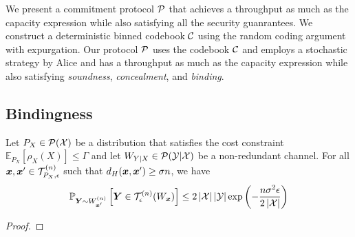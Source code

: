 We present a commitment protocol $\mathcal{P}$ that achieves a throughput as much as the capacity expression while also satisfying all the security guanrantees. 
We construct a deterministic binned codebook $\mathcal{C}$ using the random coding argument with expurgation.
Our protocol $\mathcal{P}$ uses the codebook $\mathcal{C}$ and employs a stochastic strategy by Alice and has a throughput as much as the capacity expression while also satisfying \emph{soundness}, \emph{concealment}, and \emph{binding}.

\subsection{Bindingness}

\begin{lemma}
    \label{lem:binding}
    Let $P_X \in \mathcal{P}(\mathcal{X})$ be a distribution that satisfies the cost constraint $\mathbb{E}_{P_X}[\rho_X(X)]\leq \Gamma$ and let $W_{Y|X} \in \mathcal{P}(\mathcal{Y}|\mathcal{X})$ be a non-redundant channel. 
    For all $\boldsymbol{x}, \boldsymbol{x}' \in \mathcal{T}^{(n)}_{P_X, \epsilon}$ such that $d_H(\boldsymbol{x},\boldsymbol{x}') \geq \sigma n$, we have
    \begin{equation}
        \mathbb{P} _{\boldsymbol{Y} \sim W_{\boldsymbol{x}'}^{(n)}} \left[  \boldsymbol{Y} \in \mathcal{T}^{(n)}_{\epsilon} (W_{\boldsymbol{x}})  \right] 
        \leq 2 \left| \mathcal{X} \right| \left| \mathcal{Y} \right| \exp \left( -\frac{n \sigma^2 \epsilon}{2 \left| \mathcal{X} \right|} \right)
    \end{equation} 
\end{lemma}

\begin{proof}
    
\end{proof}